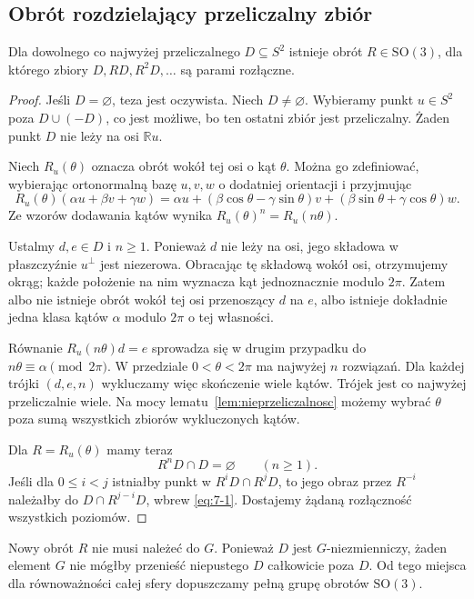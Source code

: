 \subsection{Obrót rozdzielający przeliczalny zbiór}
\begin{lemat}\label{lem:obrot-rozdzielajacy}
Dla dowolnego co najwyżej przeliczalnego $D\subseteq S^2$ istnieje obrót $R\in\mathrm{SO}(3)$, dla którego zbiory $D,RD,R^2D,\ldots$ są parami rozłączne.
\end{lemat}
\begin{proof}
Jeśli $D=\varnothing$, teza jest oczywista. Niech $D\ne\varnothing$. Wybieramy punkt $u\in S^2$ poza $D\cup(-D)$, co jest możliwe, bo ten ostatni zbiór jest przeliczalny. Żaden punkt $D$ nie leży na osi $\mathbb R u$.

Niech $R_u(\theta)$ oznacza obrót wokół tej osi o kąt $\theta$. Można go zdefiniować, wybierając ortonormalną bazę $u,v,w$ o dodatniej orientacji i przyjmując
\[
 R_u(\theta)(\alpha u+\beta v+\gamma w)=\alpha u+
 (\beta\cos\theta-\gamma\sin\theta)v+
 (\beta\sin\theta+\gamma\cos\theta)w.
\]
Ze wzorów dodawania kątów wynika $R_u(\theta)^n=R_u(n\theta)$.

Ustalmy $d,e\in D$ i $n\ge1$. Ponieważ $d$ nie leży na osi, jego składowa w płaszczyźnie $u^\perp$ jest niezerowa. Obracając tę składową wokół osi, otrzymujemy okrąg; każde położenie na nim wyznacza kąt jednoznacznie modulo $2\pi$. Zatem albo nie istnieje obrót wokół tej osi przenoszący $d$ na $e$, albo istnieje dokładnie jedna klasa kątów $\alpha$ modulo $2\pi$ o tej własności.

Równanie $R_u(n\theta)d=e$ sprowadza się w drugim przypadku do $n\theta\equiv\alpha\pmod{2\pi}$. W przedziale $0<\theta<2\pi$ ma najwyżej $n$ rozwiązań. Dla każdej trójki $(d,e,n)$ wykluczamy więc skończenie wiele kątów. Trójek jest co najwyżej przeliczalnie wiele. Na mocy lematu~\ref{lem:nieprzeliczalnosc} możemy wybrać $\theta$ poza sumą wszystkich zbiorów wykluczonych kątów.

Dla $R=R_u(\theta)$ mamy teraz
\begin{equation}\label{eq:7-1}
 R^nD\cap D=\varnothing\qquad(n\ge1).
\end{equation}
Jeśli dla $0\le i<j$ istniałby punkt w $R^iD\cap R^jD$, to jego obraz przez $R^{-i}$ należałby do $D\cap R^{j-i}D$, wbrew \eqref{eq:7-1}. Dostajemy żądaną rozłączność wszystkich poziomów.
\end{proof}
\begin{uwaga}
Nowy obrót $R$ nie musi należeć do $G$. Ponieważ $D$ jest $G$-niezmienniczy, żaden element $G$ nie mógłby przenieść niepustego $D$ całkowicie poza $D$. Od tego miejsca dla równoważności całej sfery dopuszczamy pełną grupę obrotów $\mathrm{SO}(3)$.
\end{uwaga}
